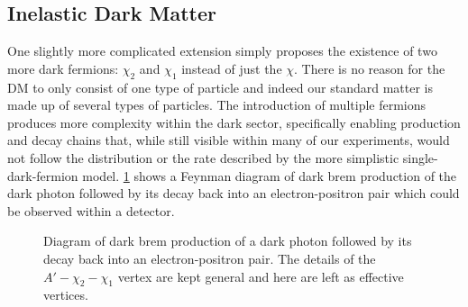 \subsection{Inelastic Dark Matter}
\label{sec:theory-idm}

One slightly more complicated extension simply proposes the existence of two more dark fermions:
\(\chi_2\) and \(\chi_1\) instead of just the \(\chi\). There is no reason for the DM to only
consist of one type of particle and indeed our standard matter is made up of several types of
particles. The introduction of multiple fermions produces more complexity within the
dark sector, specifically enabling production and decay chains that, while still visible within
many of our experiments, would not follow the distribution or the rate described by the more
simplistic single-dark-fermion model. \cref{fig:dark-brem-idm-decay} shows a Feynman diagram of
dark brem production of the dark photon followed by its decay back into an electron-positron
pair which could be observed within a detector.

\begin{figure}
  \centering
  \caption{
    Diagram of dark brem production of a dark photon followed by its decay back into an electron-positron pair.
    The details of the $A'-\chi_2-\chi_1$ vertex are kept general and here are left as effective vertices.
  }
  \label{fig:dark-brem-idm-decay}
\end{figure}

